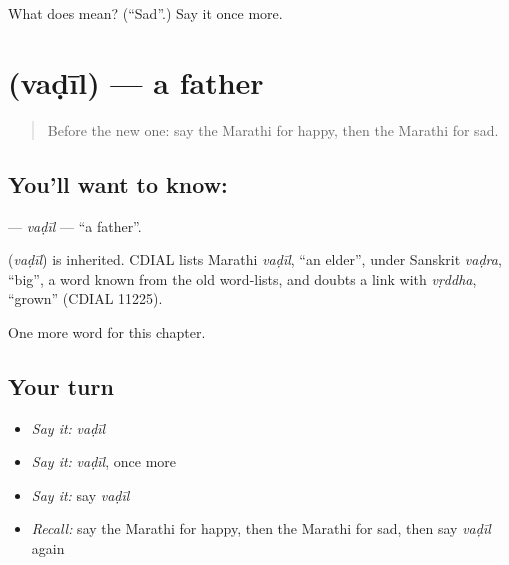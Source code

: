 \begin{tcolorbox}[breakable,colback=teal!4,colframe=teal!35!black,title={Before you move on}]
What does  mean? (\textquotedblleft{}Sad\textquotedblright{}.) Say it once more.
\end{tcolorbox}
\section[\texorpdfstring{\mr{वडील} (vaḍīl)}{वडील (vaḍīl)}]{ (vaḍīl) — a father}

\label{lesson:MR-C74-vadil}



\begin{quote}
Before the new one: say the Marathi for happy, then the Marathi for sad.
\end{quote}

\subsection*{You'll want to know: }
\textbf{} — \emph{vaḍīl} — \textquotedblleft{}a father\textquotedblright{}.

\begin{cousinweb}
\textbf{} (\emph{vaḍīl}) is inherited. CDIAL lists Marathi \emph{vaḍīl}, \textquotedblleft{}an elder\textquotedblright{}, under Sanskrit \emph{vaḍra}, \textquotedblleft{}big\textquotedblright{}, a word known from the old word-lists, and doubts a link with \emph{vṛddha}, \textquotedblleft{}grown\textquotedblright{} (CDIAL 11225).
\end{cousinweb}

\begin{grammarlens}[title={What you've built}]
One more word for this chapter.
\end{grammarlens}

\subsection*{Your turn}
\begin{itemize}
\raggedright
  \item \emph{Say it:} \emph{vaḍīl}
  \item \emph{Say it:} \emph{vaḍīl}, once more
  \item \emph{Say it:} say \emph{vaḍīl}
  \item \emph{Recall:} say the Marathi for happy, then the Marathi for sad, then say \emph{vaḍīl} again
\end{itemize}

